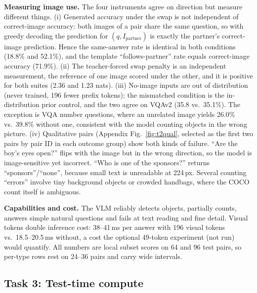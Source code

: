 \documentclass{article}
\begin{document}
\textbf{Measuring image use.} The four instruments agree on direction but measure different things. (i) Generated accuracy under the swap is not independent of correct-image accuracy: both images of a pair share the same question, so with greedy decoding the prediction for $(q, I_\text{partner})$ is exactly the partner's correct-image prediction. Hence the same-answer rate is identical in both conditions (18.8\% and 52.1\%), and the template ``follows-partner'' rate equals correct-image accuracy (71.9\%). (ii) The teacher-forced swap penalty is an independent measurement, the reference of one image scored under the other, and it is positive for both suites (2.36 and 1.23 nats). (iii) No-image inputs are out of distribution (never trained, 196 fewer prefix tokens); the mismatched condition is the in-distribution prior control, and the two agree on VQAv2 (35.8 vs.\ 35.1\%). The exception is VQA number questions, where an unrelated image yields 26.0\% vs.\ 39.8\% without one, consistent with the model counting objects in the wrong picture. (iv) Qualitative pairs (Appendix Fig.~\ref{fig:t2qual}, selected as the first two pairs by pair ID in each outcome group) show both kinds of failure. ``Are the boy's eyes open?'' flips with the image but in the wrong direction, so the model is image-sensitive yet incorrect. ``Who is one of the sponsors?'' returns ``sponsors''/``none'', because small text is unreadable at 224\,px. Several counting ``errors'' involve tiny background objects or crowded handbags, where the COCO count itself is ambiguous.

\textbf{Capabilities and cost.} The VLM reliably detects objects, partially counts, answers simple natural questions and fails at text reading and fine detail. Visual tokens double inference cost: 38--41\,ms per answer with 196 visual tokens vs.\ 18.5--20.5\,ms without, a cost the optional 49-token experiment (not run) would quantify. All numbers are local subset scores on 64 and 96 test pairs, so per-type rows rest on 24--36 pairs and carry wide intervals.

\subsection{Task 3: Test-time compute}
\end{document}
